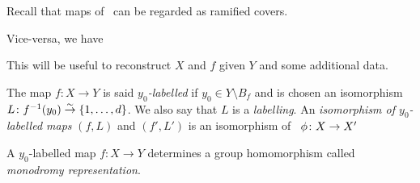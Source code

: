 \documentclass[10pt,handout]{beamer} %
\begin{document}
\begin{frame}

Recall that maps of \rss\ can be regarded as ramified covers.

\pause
Vice-versa, we have


This will be useful to reconstruct $X$ and $f$ given $Y$ and some additional data.

\end{frame}


\begin{frame}

\begin{definition}
	The map $f\colon X\to Y$ is said \emph{$y_0$-labelled} if $y_0\in Y\setminus B_f$ and is chosen an isomorphism $L\colon f^{-1}(y_0)\overset\sim\to \{1,\ldots,d\}$. We also say that $L$ is a \emph{labelling}. An \emph{isomorphism of $y_0$-labelled maps} $(f,L)$ and $(f',L')$ is an isomorphism of \rss\ $\phi\colon X\to X'$ \st 
\end{definition}
\pause
\begin{definition}
	A $y_0$-labelled map $f\colon X\to Y$ determines a group homomorphism 
	called \emph{monodromy representation}.
\end{definition}



\end{frame}
\end{document}

